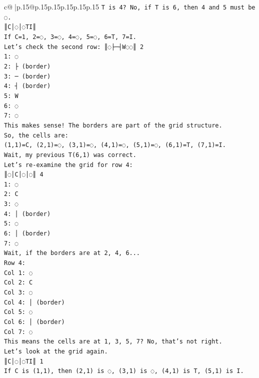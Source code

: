 \documentclass{article}
\begin{document}
{\begin{supertabular}{c@{$\;$}|p{.15\linewidth}@{}p{.15\linewidth}p{.15\linewidth}p{.15\linewidth}p{.15\linewidth}p{.15\linewidth}}
{{{\texttt{T is 4? No, if T is 6, then 4 and 5 must be ◌.} \\
\texttt{║C│◌│◌TI║} \\
\texttt{If C=1, 2=◌, 3=◌, 4=◌, 5=◌, 6=T, 7=I.} \\
\texttt{Let's check the second row: ║◌├─┤W◌◌║ 2} \\
\texttt{1: ◌} \\
\texttt{2: ├ (border)} \\
\texttt{3: ─ (border)} \\
\texttt{4: ┤ (border)} \\
\texttt{5: W} \\
\texttt{6: ◌} \\
\texttt{7: ◌} \\
\texttt{This makes sense! The borders are part of the grid structure.} \\
\texttt{So, the cells are:} \\
\texttt{(1,1)=C, (2,1)=◌, (3,1)=◌, (4,1)=◌, (5,1)=◌, (6,1)=T, (7,1)=I.} \\
\texttt{Wait, my previous T(6,1) was correct.} \\
\texttt{Let's re{-}examine the grid for row 4:} \\
\texttt{║◌│C│◌│◌║ 4} \\
\texttt{1: ◌} \\
\texttt{2: C} \\
\texttt{3: ◌} \\
\texttt{4: │ (border)} \\
\texttt{5: ◌} \\
\texttt{6: │ (border)} \\
\texttt{7: ◌} \\
\texttt{Wait, if the borders are at 2, 4, 6...} \\
\texttt{Row 4:} \\
\texttt{Col 1: ◌} \\
\texttt{Col 2: C} \\
\texttt{Col 3: ◌} \\
\texttt{Col 4: │ (border)} \\
\texttt{Col 5: ◌} \\
\texttt{Col 6: │ (border)} \\
\texttt{Col 7: ◌} \\
\texttt{This means the cells are at 1, 3, 5, 7? No, that's not right.} \\
\texttt{Let's look at the grid again.} \\
\texttt{║C│◌│◌TI║ 1} \\
\texttt{If C is (1,1), then (2,1) is ◌, (3,1) is ◌, (4,1) is T, (5,1) is I.} \\
}}}
\end{supertabular}}
\end{document}
